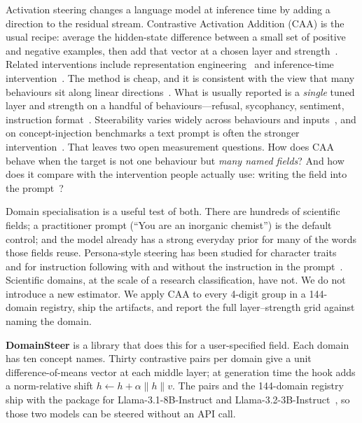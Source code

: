 \documentclass{article} %
\begin{document}
Activation steering changes a language model at inference time by adding a direction to the residual stream.
Contrastive Activation Addition (CAA) is the usual recipe: average the hidden-state difference between a small set of positive and negative examples, then add that vector at a chosen layer and strength~\citep{turner2024actadd,rimsky2024caa}.
Related interventions include representation engineering~\citep{zou2023repe} and inference-time intervention~\citep{li2023iti}.
The method is cheap, and it is consistent with the view that many behaviours sit along linear directions~\citep{park2024linear,marks2024geometry}.
What is usually reported is a \emph{single} tuned layer and strength on a handful of behaviours---refusal, sycophancy, sentiment, instruction format~\citep{rimsky2024caa,arditi2024refusal,stolfo2025instruction}.
Steerability varies widely across behaviours and inputs~\citep{tan2024steering,pres2024unreliability}, and on concept-injection benchmarks a text prompt is often the stronger intervention~\citep{wu2025axbench}.
That leaves two open measurement questions.
How does CAA behave when the target is not one behaviour but \emph{many named fields}?
And how does it compare with the intervention people actually use: writing the field into the prompt~\citep{zheng2024personas}?

Domain specialisation is a useful test of both.
There are hundreds of scientific fields; a practitioner prompt (``You are an inorganic chemist'') is the default control; and the model already has a strong everyday prior for many of the words those fields reuse.
Persona-style steering has been studied for character traits~\citep{chen2025persona} and for instruction following with and without the instruction in the prompt~\citep{stolfo2025instruction}.
Scientific domains, at the scale of a research classification, have not.
We do not introduce a new estimator.
We apply CAA to every 4-digit group in a 144-domain registry, ship the artifacts, and report the full layer--strength grid against naming the domain.

\textbf{DomainSteer} is a library that does this for a user-specified field.
Each domain has ten concept names.
Thirty contrastive pairs per domain give a unit difference-of-means vector at each middle layer; at generation time the hook adds a norm-relative shift $h \leftarrow h + \alpha\|h\|v$.
The pairs and the 144-domain registry ship with the package for Llama-3.1-8B-Instruct and Llama-3.2-3B-Instruct~\citep{grattafiori2024llama3}, so those two models can be steered without an API call.
\end{document}
